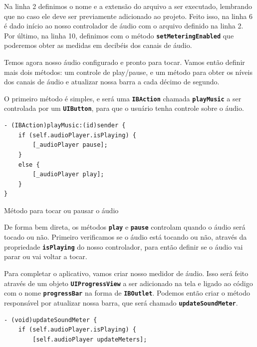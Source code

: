 \documentclass[a4paper,12pt,brazil,doubleside]{book}
\begin{document}
\begin{singlespace}
Na linha 2 definimos o nome e a extensão do arquivo a ser executado, lembrando que no caso ele deve ser previamente adicionado ao projeto. Feito isso, na linha 6 é dado início ao nosso controlador de áudio com o arquivo definido na linha 2. Por último, na linha 10, definimos com o método \texttt{\textbf{setMeteringEnabled}} que poderemos obter as medidas em decibéis dos canais de áudio.

Temos agora nosso áudio configurado e pronto para tocar. Vamos então definir mais dois métodos: um controle de play/pause, e um método para obter os níveis dos canais de áudio e atualizar nossa barra a cada décimo de segundo.

O primeiro método é simples, e será uma \texttt{\textbf{IBAction}} chamada \texttt{\textbf{playMusic}} a ser controlada por um \texttt{\textbf{UIButton}}, para que o usuário tenha controle sobre o áudio.

\begin{listing}[H]
\begin{verbatim}
- (IBAction)playMusic:(id)sender {
    if (self.audioPlayer.isPlaying) {
        [_audioPlayer pause];
    }
    else {
        [_audioPlayer play];
    }
}
\end{verbatim}
\caption{Método para tocar ou pausar o áudio}
\end{listing}


De forma bem direta, os métodos \texttt{\textbf{play}} e \texttt{\textbf{pause}} controlam quando o áudio será tocado ou não. Primeiro verificamos se o áudio está tocando ou não, através da propriedade \texttt{\textbf{isPlaying}} do nosso controlador, para então definir se o áudio vai parar ou vai voltar a tocar.

Para completar o aplicativo, vamos criar nosso medidor de áudio. Isso será feito através de um objeto \texttt{\textbf{UIProgressView}} a ser adicionado na tela e ligado ao código com o nome \texttt{\textbf{progressBar}} na forma de \texttt{\textbf{IBOutlet}}. Podemos então criar o método responsável por atualizar nossa barra, que será chamado \texttt{\textbf{updateSoundMeter}}.

\begin{listing}[H]
\begin{verbatim}
- (void)updateSoundMeter {
    if (self.audioPlayer.isPlaying) {
        [self.audioPlayer updateMeters];
    

\end{verbatim}
\end{listing}
\end{singlespace}
\end{document}

